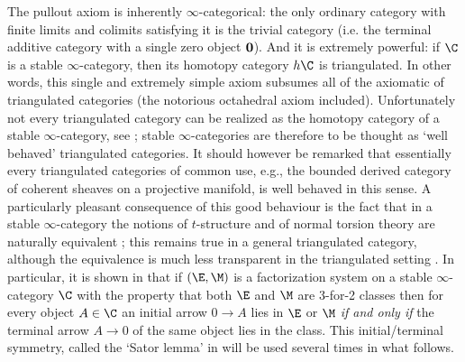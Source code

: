 {The pullout axiom is inherently $\infty$-categorical: the only ordinary category with finite limits and colimits satisfying it is the trivial category (i.e. the terminal additive category with a single zero object $\bf 0$). And it is extremely powerful: if $\C$ is a stable $\infty$-category, then its homotopy category $h\C$ is triangulated. In other words, this single and extremely simple axiom subsumes all of the axiomatic of triangulated categories (the notorious octahedral axiom included). Unfortunately not every triangulated category can be realized as the homotopy category of a stable $\infty$-category, see \cite{???}; stable $\infty$-categories are therefore to be thought as `well behaved' triangulated categories. It should however be remarked that essentially every triangulated categories of common use, e.g., the bounded derived category of coherent sheaves on a projective manifold, is well behaved in this sense. A particularly pleasant consequence of this good behaviour is the fact that in a stable $\infty$-category the notions of $t$-structure and of normal torsion theory are naturally equivalent  \cite{Fiorenza2014}; this remains true in a general triangulated category, although the equivalence is much less transparent in the triangulated setting \cite{tderiv}. In particular, it is shown in \cite{Fiorenza2014} that if $(\E,\M)$ is a factorization system on a stable $\infty$-category $\C$ with the property that both $\E$ and $\M$ are 3-for-2 classes then for every object $A\in\C$ an initial arrow $0\to A$ lies in $\E$ or $\M$ \emph{if and only if} the terminal arrow $A\to 0$ of the same object lies in the class. This initial/terminal symmetry, called the `Sator lemma' in \cite{Fiorenza2014} will be used several times in what follows.

}
